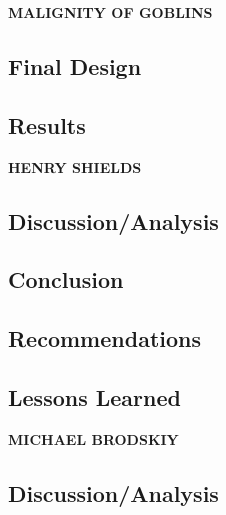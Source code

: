 \documentclass[conference]{IEEEtran}
\begin{document}
\lipsum[35-37]


\vspace{10pt} \LARGE \textbf{MALIGNITY OF GOBLINS} \normalsize

\subsection{Final Design}

\lipsum[38-40]

\subsection{Results}

\lipsum[41-43]


\vspace{10pt} \LARGE \textbf{HENRY SHIELDS} \normalsize

\subsection{Discussion/Analysis}

\lipsum[44-46]

\subsection{Conclusion}

\lipsum[47-49]

\subsection{Recommendations}

\lipsum[50-52]

\subsection{Lessons Learned}

\lipsum[53-55]


\vspace{10pt} \LARGE \textbf{MICHAEL BRODSKIY} \normalsize

\subsection{Discussion/Analysis}
\end{document}
